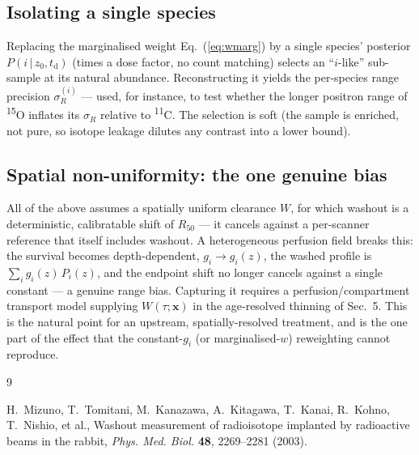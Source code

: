 \documentclass[11pt]{article}
\newcommand{\iso}[2]{\textsuperscript{#1}#2}
\begin{document}
\subsection*{Isolating a single species}

Replacing the marginalised weight Eq.~(\ref{eq:wmarg}) by a single species'
posterior $P(i\,|\,z_0,t_{\mathrm{d}})$ (times a dose factor, no count matching)
selects an ``$i$-like'' sub-sample at its natural abundance. Reconstructing it
yields the per-species range precision $\sigma_R^{(i)}$ --- used, for instance, to
test whether the longer positron range of \iso{15}{O} inflates its $\sigma_R$
relative to \iso{11}{C}. The selection is soft (the sample is enriched, not pure,
so isotope leakage dilutes any contrast into a lower bound).

\subsection*{Spatial non-uniformity: the one genuine bias}

All of the above assumes a spatially uniform clearance $W$, for which washout is a
deterministic, calibratable shift of $R_{50}$ --- it cancels against a per-scanner
reference that itself includes washout. A heterogeneous perfusion field breaks
this: the survival becomes depth-dependent, $g_i\to g_i(z)$, the washed profile is
$\sum_i g_i(z)\,P_i(z)$, and the endpoint shift no longer cancels against a single
constant --- a genuine range bias. Capturing it requires a perfusion/compartment
transport model supplying $W(\tau;\mathbf{x})$ in the age-resolved thinning of
Sec.~5. This is the natural point for an upstream, spatially-resolved treatment,
and is the one part of the effect that the constant-$g_i$ (or marginalised-$w$)
reweighting cannot reproduce.

\begin{thebibliography}{9}

H.~Mizuno, T.~Tomitani, M.~Kanazawa, A.~Kitagawa, T.~Kanai, R.~Kohno,
T.~Nishio, et al.,
\newblock Washout measurement of radioisotope implanted by radioactive beams in
the rabbit,
\newblock \emph{Phys. Med. Biol.} \textbf{48}, 2269--2281 (2003).

\end{thebibliography}
\end{document}
